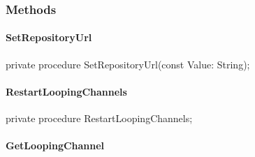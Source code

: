 \documentclass{report}
\begin{document}
\subsubsection*{\large{\textbf{Methods}}\normalsize\hspace{1ex}\hfill}
\paragraph*{SetRepositoryUrl}\hspace*{\fill}

\begin{list}{}{
\setlength{\itemindent}{0cm}
\setlength{\listparindent}{0cm}
\setlength{\leftmargin}{\evensidemargin}
\addtolength{\leftmargin}{\tmplength}
\settowidth{\labelsep}{X}
\addtolength{\leftmargin}{\labelsep}
\setlength{\labelwidth}{\tmplength}
}
\begin{flushleft}
\item[\textbf{Declaration}\hfill]
\begin{ttfamily}
private procedure SetRepositoryUrl(const Value: String);\end{ttfamily}


\end{flushleft}
\end{list}
\paragraph*{RestartLoopingChannels}\hspace*{\fill}

\begin{list}{}{
\setlength{\itemindent}{0cm}
\setlength{\listparindent}{0cm}
\setlength{\leftmargin}{\evensidemargin}
\addtolength{\leftmargin}{\tmplength}
\settowidth{\labelsep}{X}
\addtolength{\leftmargin}{\labelsep}
\setlength{\labelwidth}{\tmplength}
}
\begin{flushleft}
\item[\textbf{Declaration}\hfill]
\begin{ttfamily}
private procedure RestartLoopingChannels;\end{ttfamily}


\end{flushleft}
\end{list}
\paragraph*{GetLoopingChannel}\hspace*{\fill}
\end{document}

